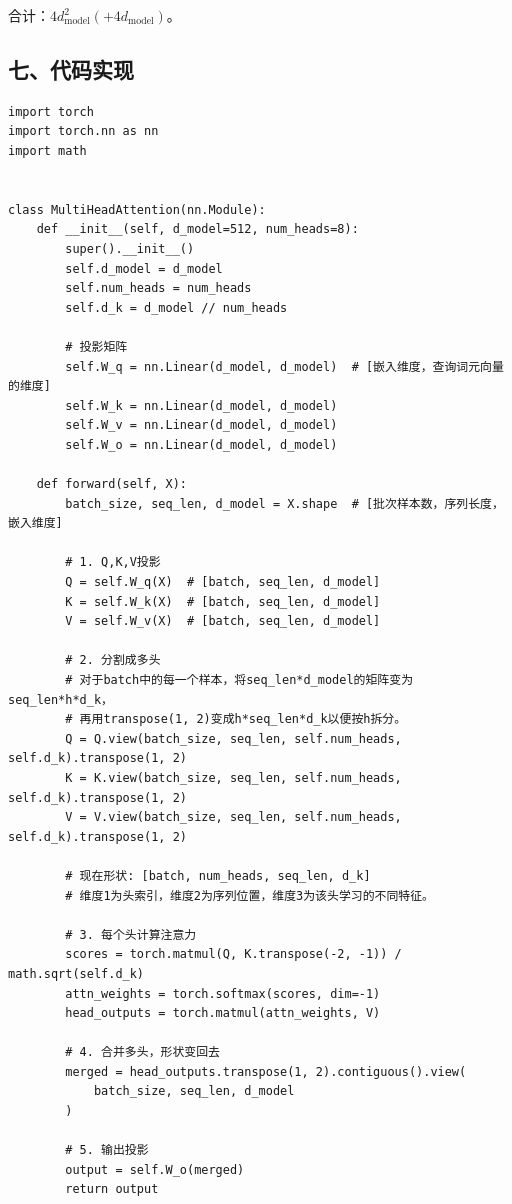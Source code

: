合计：\(4d_{\mathrm{model}}^2(+4d_{\mathrm{model}})\)。

\hypertarget{ux4e03ux4ee3ux7801ux5b9eux73b0}{%
\subsection{七、代码实现}\label{ux4e03ux4ee3ux7801ux5b9eux73b0}}

\begin{verbatim}
import torch
import torch.nn as nn
import math


class MultiHeadAttention(nn.Module):
    def __init__(self, d_model=512, num_heads=8):
        super().__init__()
        self.d_model = d_model
        self.num_heads = num_heads
        self.d_k = d_model // num_heads

        # 投影矩阵
        self.W_q = nn.Linear(d_model, d_model)  # [嵌入维度，查询词元向量的维度]
        self.W_k = nn.Linear(d_model, d_model)
        self.W_v = nn.Linear(d_model, d_model)
        self.W_o = nn.Linear(d_model, d_model)

    def forward(self, X):
        batch_size, seq_len, d_model = X.shape  # [批次样本数，序列长度，嵌入维度]

        # 1. Q,K,V投影
        Q = self.W_q(X)  # [batch, seq_len, d_model]
        K = self.W_k(X)  # [batch, seq_len, d_model]
        V = self.W_v(X)  # [batch, seq_len, d_model]

        # 2. 分割成多头
        # 对于batch中的每一个样本，将seq_len*d_model的矩阵变为seq_len*h*d_k，
        # 再用transpose(1, 2)变成h*seq_len*d_k以便按h拆分。
        Q = Q.view(batch_size, seq_len, self.num_heads, self.d_k).transpose(1, 2)
        K = K.view(batch_size, seq_len, self.num_heads, self.d_k).transpose(1, 2)
        V = V.view(batch_size, seq_len, self.num_heads, self.d_k).transpose(1, 2)

        # 现在形状: [batch, num_heads, seq_len, d_k]
        # 维度1为头索引，维度2为序列位置，维度3为该头学习的不同特征。

        # 3. 每个头计算注意力
        scores = torch.matmul(Q, K.transpose(-2, -1)) / math.sqrt(self.d_k)
        attn_weights = torch.softmax(scores, dim=-1)
        head_outputs = torch.matmul(attn_weights, V)

        # 4. 合并多头，形状变回去
        merged = head_outputs.transpose(1, 2).contiguous().view(
            batch_size, seq_len, d_model
        )

        # 5. 输出投影
        output = self.W_o(merged)
        return output
\end{verbatim}

